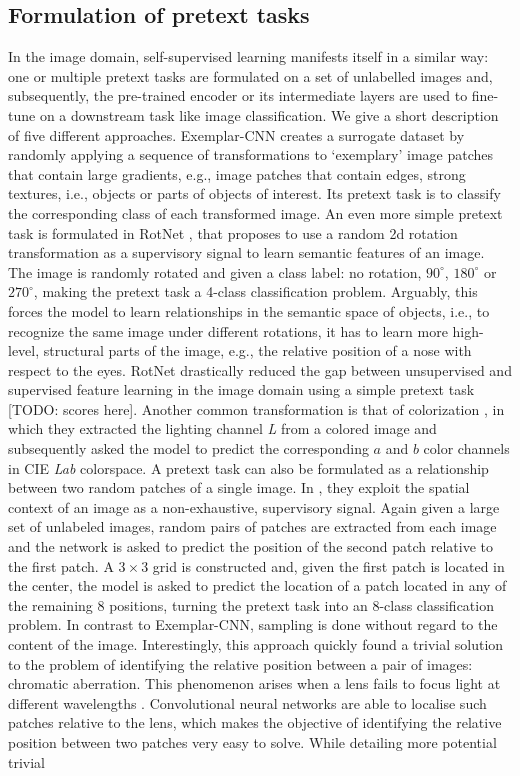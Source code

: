 \subsection{Formulation of pretext tasks}
In the image domain, self-supervised learning manifests itself in a similar way: one or multiple pretext tasks are formulated on a set of unlabelled images and, subsequently, the pre-trained encoder or its intermediate layers are used to fine-tune on a downstream task like image classification. We give a short description of five different approaches. Exemplar-CNN \cite{dosovitskiy_discriminative_2014} creates a surrogate dataset by randomly applying a sequence of transformations to `exemplary' image patches that contain large gradients, e.g., image patches that contain edges, strong textures, i.e., objects or parts of objects of interest. Its pretext task is to classify the corresponding class of each transformed image. An even more simple pretext task is formulated in RotNet \cite{gidaris2018unsupervised}, that proposes to use a random 2d rotation transformation as a supervisory signal to learn semantic features of an image. The image is randomly rotated and given a class label: no rotation, $90^\circ$, $180^\circ$ or $270^\circ$, making the pretext task a 4-class classification problem. Arguably, this forces the model to learn relationships in the semantic space of objects, i.e., to recognize the same image under different rotations, it has to learn more high-level, structural parts of the image, e.g., the relative position of a nose with respect to the eyes. RotNet drastically reduced the gap between unsupervised and supervised feature learning in the image domain using a simple pretext task [TODO: scores here]. Another common transformation is that of colorization \cite{zhang_colorful_2016}, in which they extracted the lighting channel \textit{L} from a colored image and subsequently asked the model to predict the corresponding $a$ and $b$ color channels in CIE \textit{Lab} colorspace. A pretext task can also be formulated as a relationship between two random patches of a single image. In \cite{doersch2015unsupervised}, they exploit the spatial context of an image as a non-exhaustive, supervisory signal. Again given a large set of unlabeled images, random pairs of patches are extracted from each image and the network is asked to predict the position of the second patch relative to the first patch. A $3\times 3$ grid is constructed and, given the first patch is located in the center, the model is asked to predict the location of a patch located in any of the remaining 8 positions, turning the pretext task into an 8-class classification problem. In contrast to Exemplar-CNN, sampling is done without regard to the content of the image. Interestingly, this approach quickly found a trivial solution to the problem of identifying the relative position between a pair of images: chromatic aberration. This phenomenon arises when a lens fails to focus light at different wavelengths \cite{brewster_treatise_1835}. Convolutional neural networks are able to localise such patches relative to the lens, which makes the objective of identifying the relative position between two patches very easy to solve. While detailing more potential trivial 
